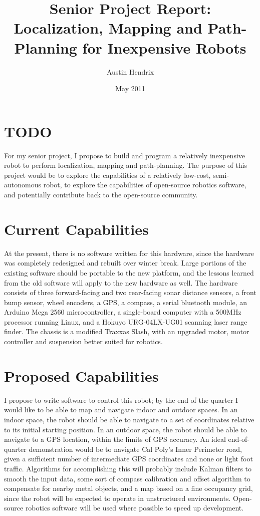 \documentclass[a4paper,12pt]{article}
\begin{document}
\title{Senior Project Report: Localization, Mapping and Path-Planning for Inexpensive Robots}
\author{Austin Hendrix}
\date{May 2011}
\maketitle

\section{TODO}


For my senior project, I propose to build and program a relatively inexpensive robot to perform localization, mapping and path-planning. The purpose of this project would be to explore the capabilities of a relatively low-cost, semi-autonomous robot, to explore the capabilities of open-source robotics software, and potentially contribute back to the open-source community.

\section{Current Capabilities}

At the present, there is no software written for this hardware, since the hardware was completely redesigned and rebuilt over winter break. Large portions of the existing software should be portable to the new platform, and the lessons learned from the old software will apply to the new hardware as well. The hardware consists of three forward-facing and two rear-facing sonar distance sensors, a front bump sensor, wheel encoders, a GPS, a compass, a serial bluetooth module, an Arduino Mega 2560 microcontroller, a single-board computer with a 500MHz processor running Linux, and a Hokuyo URG-04LX-UG01 scanning laser range finder. The chassis is a modified Traxxas Slash, with an upgraded motor, motor controller and suspension better suited for robotics. 

\section{Proposed Capabilities}

I propose to write software to control this robot; by the end of the quarter I would like to be able to map and navigate indoor and outdoor spaces. In an indoor space, the robot should be able to navigate to a set of coordinates relative to its initial starting position. In an outdoor space, the robot should be able to navigate to a GPS location, within the limits of GPS accuracy. An ideal end-of-quarter demonstration would be to navigate Cal Poly's Inner Perimeter road, given a sufficient number of intermediate GPS coordinates and none or light foot traffic. Algorithms for accomplishing this will probably include Kalman filters to smooth the input data, some sort of compass calibration and offset algorithm to compensate for nearby metal objects, and a map based on a fine occupancy grid, since the robot will be expected to operate in unstructured environments. Open-source robotics software will be used where possible to speed up development. 
\end{document}
